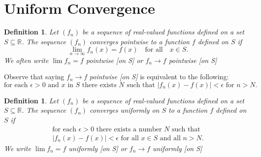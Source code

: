 \documentclass[12pt, lettersize]{book}
\newtheorem{dfn}[thm]{Definition}
\newcommand{\R}{\mathbb{R}}
\begin{document}
		\section{Uniform Convergence}
			\begin{dfn}
			Let $(f_n)$ be a sequence of real-valued functions defined on a set $S\subseteq\R$. The sequence $(f_n)$ \emph{converges pointwise} to a function $f$ defined on $S$ if
			\begin{displaymath}
				\lim\limits_{n\rightarrow\infty}f_n(x)=f(x)\quad\text{for all}\quad x\in S.
			\end{displaymath}
			We often write $\lim f_n=f$ \emph{pointwise [on S]} or $f_n\rightarrow f$ \emph{pointwise [on S]}
			\end{dfn}
			Observe that saying $f_n\rightarrow f$ \emph{pointwise [on S]} is equivalent to the following:
			\begin{displaymath}
				\text{for each $\epsilon>0$ and $x$ in $S$ there exists $N$ such that $|f_n(x)-f(x)|<\epsilon$ for $n>N$.}
			\end{displaymath}
			
			\begin{dfn}
			Let $(f_n)$ be a sequence of real-valued functions defined on a set $S\subseteq\R$. The sequence $(f_n)$ \emph{converges uniformly} on $S$ to a function $f$ defined on $S$ if
			\begin{align*}
				\text{for each $\epsilon>0$ there exists a number $N$ such that}\\
				\text{$|f_n(x)-f(x)|<\epsilon$ for all $x\in S$ and all $n>N$.}
			\end{align*}
			We write $\lim f_n=f$ \emph{uniformly [on S]} or $f_n\rightarrow f$ \emph{uniformly [on S]}
			\end{dfn}
			
\end{document}
